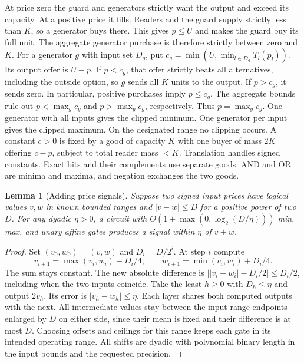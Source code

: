 \documentclass[11pt]{article}
\newtheorem{lemma}[theorem]{Lemma}
\begin{document}
At price zero the guard and generators strictly want the output and exceed
its capacity. At a positive price it fills. Readers and the guard supply
strictly less than \(K\), so a generator buys there. This gives \(p\le U\)
and makes the guard buy its full unit. The aggregate generator purchase
is therefore strictly between zero and \(K\).
For a generator \(g\) with input set \(D_g\), put
\(c_g=\min(U,\min_{l\in D_g}T_l(p_l))\). Its output offer is \(U-p\).
If \(p<c_g\), that offer strictly beats all alternatives, including the
outside option, so \(g\) sends all \(K\) units to the output. If \(p>c_g\), it sends zero. In particular, positive purchases imply \(p\le c_g\).
The aggregate bounds rule out \(p<\max_g c_g\) and \(p>\max_g c_g\),
respectively. Thus \(p=\max_g c_g\). One generator with all inputs gives
the clipped minimum. One generator per input gives the clipped maximum.
On the designated range no clipping occurs. A constant \(c>0\) is fixed
by a good of capacity \(K\) with one buyer of mass \(2K\) offering
\(c-p\), subject to total reader mass \(<K\). Translation handles signed
constants. Exact bits and their complements use separate goods. AND and
OR are minima and maxima, and negation exchanges the two goods.

\begin{lemma}[Adding price signals]\label{lem:sum}
Suppose two signed input prices have logical values \(v,w\) in known bounded
ranges and \(|v-w|\le D\) for a positive power of two \(D\). For any dyadic
\(\eta>0\), a circuit with \(O(1+\max(0,\log_2(D/\eta)))\) min, max, and unary
affine gates produces a signal within \(\eta\) of \(v+w\).
\end{lemma}
\begin{proof}
Set \((v_0,w_0)=(v,w)\) and \(D_i=D/2^i\). At step \(i\) compute
\[
 v_{i+1}=\max(v_i,w_i)-D_i/4,\qquad
 w_{i+1}=\min(v_i,w_i)+D_i/4.
\]
The sum stays constant. The new absolute difference is
\(\bigl||v_i-w_i|-D_i/2\bigr|\le D_i/2\), including when the two
inputs coincide. Take the least \(h\ge0\) with \(D_h\le\eta\) and output
\(2v_h\). Its error is \(|v_h-w_h|\le\eta\). Each layer shares both
computed outputs with the next. All intermediate values stay between the
input range endpoints enlarged by \(D\) on either side, since their mean
is fixed and their difference is at most \(D\). Choosing offsets and
ceilings for this range keeps each gate in its intended operating range.
All shifts are dyadic with polynomial binary length in the input bounds
and the requested precision.
\end{proof}
\end{document}
